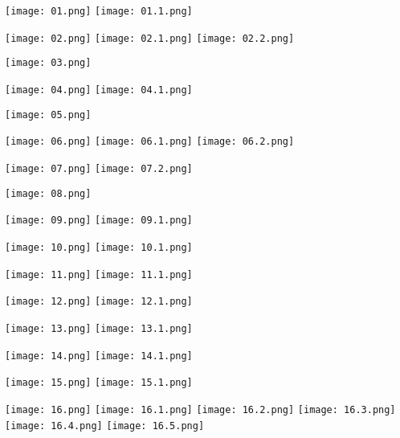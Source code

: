 \documentclass[12pt]{report}
\begin{document}


\texttt{[image: 01.png]}
\texttt{[image: 01.1.png]}

\newpage
{}
\texttt{[image: 02.png]}
\texttt{[image: 02.1.png]}
\texttt{[image: 02.2.png]}

\newpage
{}
\texttt{[image: 03.png]}


\newpage
{}
\texttt{[image: 04.png]}
\texttt{[image: 04.1.png]}

\newpage
{}
\texttt{[image: 05.png]}

\newpage
{}
\texttt{[image: 06.png]}
\texttt{[image: 06.1.png]}
\texttt{[image: 06.2.png]}

\newpage
{}
\texttt{[image: 07.png]}
\texttt{[image: 07.2.png]}

\newpage
{}
\texttt{[image: 08.png]}

\newpage
{}
\texttt{[image: 09.png]}
\texttt{[image: 09.1.png]}

\newpage
{}
\texttt{[image: 10.png]}
\texttt{[image: 10.1.png]}

\newpage
{}
\texttt{[image: 11.png]}
\texttt{[image: 11.1.png]}

\newpage
{}
\texttt{[image: 12.png]}
\texttt{[image: 12.1.png]}

\newpage
{}
\texttt{[image: 13.png]}
\newline
\texttt{[image: 13.1.png]}

\newpage
{}
\texttt{[image: 14.png]}
\newline
\texttt{[image: 14.1.png]}

\newpage
{}
\texttt{[image: 15.png]}
\texttt{[image: 15.1.png]}

\newpage
{}
\texttt{[image: 16.png]}
\newline
\texttt{[image: 16.1.png]}
\newline
\texttt{[image: 16.2.png]}
\newline
\texttt{[image: 16.3.png]}
\newline
\texttt{[image: 16.4.png]}
\newline
\texttt{[image: 16.5.png]}
\end{document}
